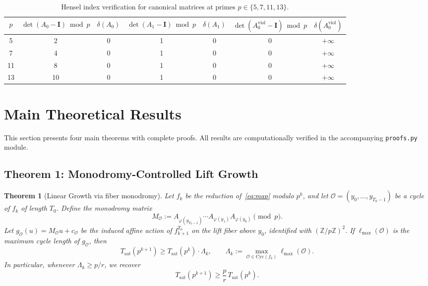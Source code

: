 \documentclass[11pt]{article}
\theoremstyle{plain}
\newtheorem{theorem}{Theorem}[section]
\theoremstyle{definition}
\newcommand{\Z}{\mathbb{Z}}
\newcommand{\Id}{\mathbf{I}}
\begin{document}
\begin{table}[ht]
\centering
\caption{Hensel index verification for canonical matrices at primes $p \in \{5,7,11,13\}$.}
\label{tab:hensel_check}
\medskip
\begin{tabular}{@{}ccccccc@{}}
\toprule
$p$ & $\det(A_0-\Id)\bmod p$ & $\delta(A_0)$ & $\det(A_1-\Id)\bmod p$ & $\delta(A_1)$ & $\det(A_0^{\mathrm{viol}}-\Id)\bmod p$ & $\delta(A_0^{\mathrm{viol}})$\\
\midrule
5  & 2  & 0 & 1  & 0 & 0 & $+\infty$\\
7  & 4  & 0 & 1  & 0 & 0 & $+\infty$\\
11 & 8  & 0 & 1  & 0 & 0 & $+\infty$\\
13 & 10 & 0 & 1  & 0 & 0 & $+\infty$\\
\bottomrule
\end{tabular}
\end{table}

\section{Main Theoretical Results}
\label{sec:theorems}

This section presents four main theorems with complete proofs. All results are computationally verified in the accompanying \texttt{proofs.py} module.

\subsection{Theorem 1: Monodromy-Controlled Lift Growth}

\begin{theorem}[Linear Growth via fiber monodromy]
\label{thm:linear_growth}
Let $f_k$ be the reduction of~\eqref{eq:map} modulo $p^k$, and let $\mathcal{O}=(y_0,\dots,y_{T_0-1})$ be a cycle of $f_k$ of length $T_0$. Define the monodromy matrix
\[
M_{\mathcal{O}}:=A_{\varphi(y_{T_0-1})}\cdots A_{\varphi(y_1)}A_{\varphi(y_0)} \pmod p.
\]
Let $g_{\mathcal{O}}(u)=M_{\mathcal{O}}u+c_{\mathcal{O}}$ be the induced affine action of $f_{k+1}^{T_0}$ on the lift fiber above $y_0$, identified with $(\Z/p\Z)^2$. If $\ell_{\max}(\mathcal{O})$ is the maximum cycle length of $g_{\mathcal{O}}$, then
\[
T_{\mathrm{sat}}(p^{k+1}) \ge T_{\mathrm{sat}}(p^k)\cdot
\Lambda_k,\qquad
\Lambda_k:=\max_{\mathcal{O}\in\mathrm{Cyc}(f_k)}\ell_{\max}(\mathcal{O}).
\]
In particular, whenever $\Lambda_k\ge p/r$, we recover
\[
T_{\mathrm{sat}}(p^{k+1}) \ge \frac{p}{r}\,T_{\mathrm{sat}}(p^k).
\]
\end{theorem}
\end{document}
